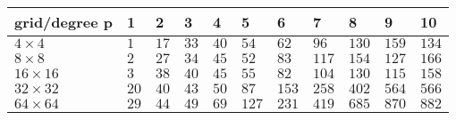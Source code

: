 \begin{tabular}{lllllllllll}
\hline
 grid/degree p   & 1    & 2    & 3    & 4    & 5     & 6     & 7     & 8     & 9     & 10    \\
\hline
 $4 \times 4$    & $1$  & $17$ & $33$ & $40$ & $54$  & $62$  & $96$  & $130$ & $159$ & $134$ \\
 $8 \times 8$    & $2$  & $27$ & $34$ & $45$ & $52$  & $83$  & $117$ & $154$ & $127$ & $166$ \\
 $16 \times 16$  & $3$  & $38$ & $40$ & $45$ & $55$  & $82$  & $104$ & $130$ & $115$ & $158$ \\
 $32 \times 32$  & $20$ & $40$ & $43$ & $50$ & $87$  & $153$ & $258$ & $402$ & $564$ & $566$ \\
 $64 \times 64$  & $29$ & $44$ & $49$ & $69$ & $127$ & $231$ & $419$ & $685$ & $870$ & $882$ \\
\hline
\end{tabular}